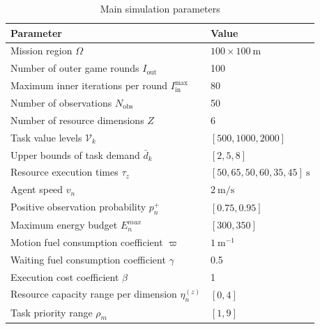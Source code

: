 \documentclass[journal,twoside,web]{ieeecolor}
\begin{document}
\begin{table}[t]
\centering
\caption{Main simulation parameters}
\label{tab:sim_params}
\scriptsize
\setlength{\tabcolsep}{5pt}
\renewcommand{\arraystretch}{1.15}
\begin{tabular}{l l}
\toprule
\textbf{Parameter} & \textbf{Value} \\
\midrule
Mission region $\Omega$ & $100\times100\ \mathrm{m}$ \\
Number of outer game rounds $I_{\mathrm{out}}$ & 100 \\
Maximum inner iterations per round $I_{\mathrm{in}}^{\max}$ & 80 \\
Number of observations $N_{\mathrm{obs}}$ & 50 \\
Number of resource dimensions $Z$ & 6 \\
Task value levels $\mathcal{V}_k$ & $[500,1000,2000]$ \\
Upper bounds of task demand $\bar{d}_k$ & $[2,5,8]$ \\
Resource execution times $\tau_z$ & $[50,65,50,60,35,45]\ \mathrm{s}$ \\
Agent speed $v_n$ & $2\ \mathrm{m/s}$ \\
Positive observation probability $p_n^{+}$ & $[0.75,0.95]$ \\
Maximum energy budget $E_n^{max}$ & $[300,350]$ \\
Motion fuel consumption coefficient $\varpi$ & $1\ \mathrm{m}^{-1}$ \\
Waiting fuel consumption coefficient $\gamma$ & 0.5 \\
Execution cost coefficient $\beta$ & 1 \\
Resource capacity range per dimension $\eta_n^{(z)}$ & $[0,4]$ \\
Task priority range $\rho_m$ & $[1,9]$ \\
\bottomrule
\end{tabular}
\end{table}
\end{document}
